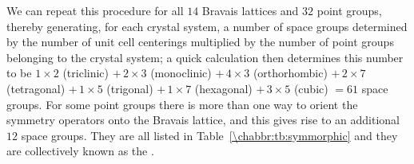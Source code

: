 We can repeat this procedure for all $14$ Bravais lattices and $32$ point groups, thereby generating, for each crystal system, a number of space groups determined by the number of unit cell centerings multiplied by the number of point groups belonging to the crystal system; a quick calculation then determines this number to be 
$1\times 2$ (triclinic) $+\, 2 \times 3$ (monoclinic) $+\, 4 \times 3$ (orthorhombic) $+\, 2\times 7$ (tetragonal) $+\, 1 \times 5$ (trigonal) $+\,1\times 7$ (hexagonal) $+\, 3 \times 5$ (cubic) $= 61$ space groups.  For some point groups there is more than one way to orient the symmetry operators onto the Bravais lattice, and this gives rise to an additional $12$ space groups. They are all listed in Table~\ref{\chabbr:tb:symmorphic} and they are collectively known as the .

